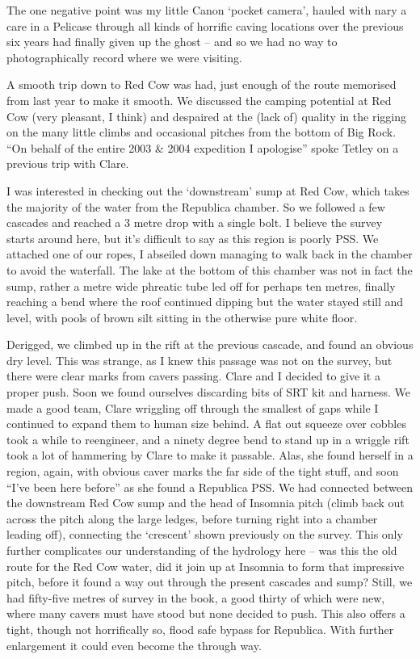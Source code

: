 The one negative point was my little Canon `pocket camera', hauled with
nary a care in a Pelicase through all kinds of horrific caving locations
over the previous six years had finally given up the ghost -- and so we
had no way to photographically record where we were visiting.

A smooth trip down to Red Cow was had, just enough of the route
memorised from last year to make it smooth. We discussed the camping
potential at Red Cow (very pleasant, I think) and despaired at the (lack
of) quality in the rigging on the many little climbs and occasional
pitches from the bottom of Big Rock. ``On behalf of the entire 2003 \&
2004 expedition I apologise'' spoke Tetley on a previous trip with
Clare.

I was interested in checking out the `downstream' sump at Red Cow, which
takes the majority of the water from the Republica chamber. So we
followed a few cascades and reached a 3 metre drop with a single bolt. I
believe the survey starts around here, but it's difficult to say as this
region is poorly PSS. We attached one of our ropes, I abseiled down
managing to walk back in the chamber to avoid the waterfall. The lake at
the bottom of this chamber was not in fact the sump, rather a metre wide
phreatic tube led off for perhaps ten metres, finally reaching a bend
where the roof continued dipping but the water stayed still and level,
with pools of brown silt sitting in the otherwise pure white floor.

Derigged, we climbed up in the rift at the previous cascade, and found
an obvious dry level. This was strange, as I knew this passage was not
on the survey, but there were clear marks from cavers passing. Clare and
I decided to give it a proper push. Soon we found ourselves discarding
bits of SRT kit and harness. We made a good team, Clare wriggling off
through the smallest of gaps while I continued to expand them to human
size behind. A flat out squeeze over cobbles took a while to reengineer,
and a ninety degree bend to stand up in a wriggle rift took a lot of
hammering by Clare to make it passable. Alas, she found herself in a
region, again, with obvious caver marks the far side of the tight stuff,
and soon ``I've been here before'' as she found a Republica PSS. We had
connected between the downstream Red Cow sump and the head of Insomnia
pitch (climb back out across the pitch along the large ledges, before
turning right into a chamber leading off), connecting the `crescent'
shown previously on the survey. This only further complicates our
understanding of the hydrology here -- was this the old route for the
Red Cow water, did it join up at Insomnia to form that impressive pitch,
before it found a way out through the present cascades and sump? Still,
we had fifty-five metres of survey in the book, a good thirty of which
were new, where many cavers must have stood but none decided to push.
This also offers a tight, though not horrifically so, flood safe bypass
for Republica. With further enlargement it could even become the through
way.

